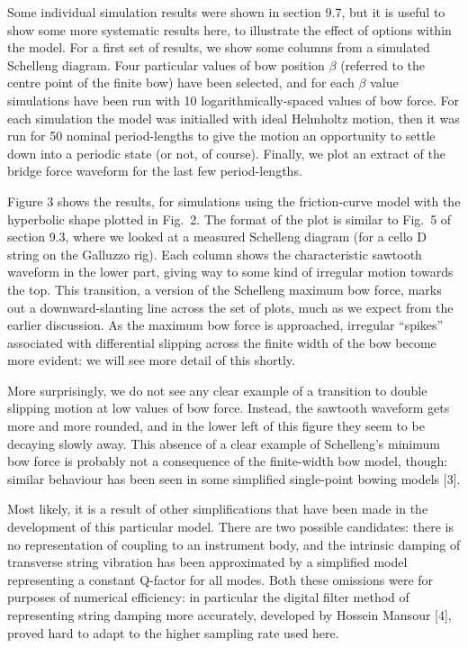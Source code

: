   Some individual simulation results were shown in section 9.7, but it is 
  useful to show some more systematic results here, to illustrate the effect of 
  options within the model. For a first set of results, we show some columns 
  from a simulated Schelleng diagram. Four particular values of bow position 
  $\beta$ (referred to the centre point of the finite bow) have been selected, 
  and for each $\beta$ value simulations have been run with 10 
  logarithmically-spaced values of bow force. For each simulation the model was 
  initialled with ideal Helmholtz motion, then it was run for 50 nominal 
  period-lengths to give the motion an opportunity to settle down into a 
  periodic state (or not, of course). Finally, we plot an extract of the bridge 
  force waveform for the last few period-lengths. 

  Figure 3 shows the results, for simulations using the friction-curve model 
  with the hyperbolic shape plotted in Fig.\ 2. The format of the plot is 
  similar to Fig.\ 5 of section 9.3, where we looked at a measured Schelleng 
  diagram (for a cello D string on the Galluzzo rig). Each column shows the 
  characteristic sawtooth waveform in the lower part, giving way to some kind 
  of irregular motion towards the top. This transition, a version of the 
  Schelleng maximum bow force, marks out a downward-slanting line across the 
  set of plots, much as we expect from the earlier discussion. As the maximum 
  bow force is approached, irregular “spikes” associated with differential 
  slipping across the finite width of the bow become more evident: we will see 
  more detail of this shortly. 

  More surprisingly, we do not see any clear example of a transition to double 
  slipping motion at low values of bow force. Instead, the sawtooth waveform 
  gets more and more rounded, and in the lower left of this figure they seem to 
  be decaying slowly away. This absence of a clear example of Schelleng’s 
  minimum bow force is probably not a consequence of the finite-width bow 
  model, though: similar behaviour has been seen in some simplified 
  single-point bowing models [3]. 

  Most likely, it is a result of other simplifications that have been made in 
  the development of this particular model. There are two possible candidates: 
  there is no representation of coupling to an instrument body, and the 
  intrinsic damping of transverse string vibration has been approximated by a 
  simplified model representing a constant Q-factor for all modes. Both these 
  omissions were for purposes of numerical efficiency: in particular the 
  digital filter method of representing string damping more accurately, 
  developed by Hossein Mansour [4], proved hard to adapt to the higher sampling 
  rate used here. 

